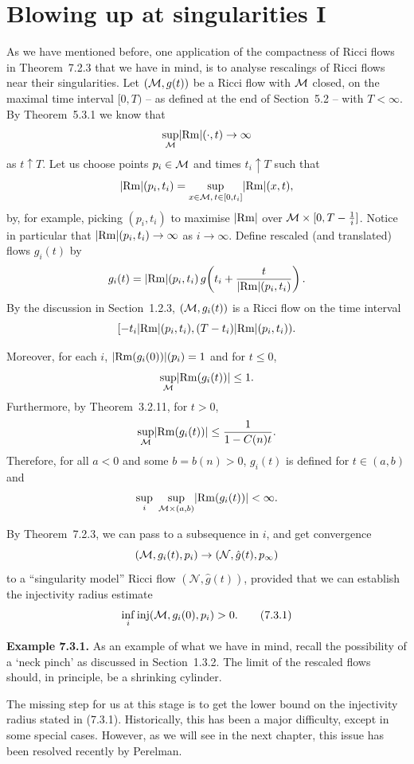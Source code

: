 \section{Blowing up at singularities I}

As we have mentioned before, one application of the compactness of Ricci flows
in Theorem~7.2.3 that we have in mind, is to analyse rescalings of Ricci flows
near their singularities. Let $(\mathcal{M},g(t))$ be a Ricci flow with $\mathcal{M}$ closed, on
the maximal time interval $[0,T)$ -- as defined at the end of
Section~5.2 -- with $T < \infty$. By Theorem~5.3.1 we know that
\[
\sup_{\mathcal{M}} \lvert \operatorname{Rm}\rvert(\cdot,t) \to \infty
\]
as $t \uparrow T$. Let us choose points $p_i \in \mathcal{M}$ and times $t_i \uparrow T$
such that
\[
\lvert \operatorname{Rm}\rvert(p_i,t_i) = \sup_{x \in \mathcal{M},\, t \in [0,t_i]} \lvert \operatorname{Rm}\rvert(x,t),
\]
by, for example, picking $(p_i,t_i)$ to maximise $\lvert \operatorname{Rm}\rvert$ over
$\mathcal{M} \times [0, T - \frac{1}{i}]$. Notice in particular that
$\lvert \operatorname{Rm}\rvert(p_i,t_i) \to \infty$ as $i \to \infty$. Define rescaled (and
translated) flows $g_i(t)$ by
\[
g_i(t) = \lvert \operatorname{Rm}\rvert(p_i,t_i)\, g\!\left(t_i + \frac{t}{\lvert \operatorname{Rm}\rvert(p_i,t_i)}\right).
\]
By the discussion in Section~1.2.3, $(\mathcal{M},g_i(t))$ is a Ricci flow on the time
interval
\[
[-t_i\lvert \operatorname{Rm}\rvert(p_i,t_i), (T-t_i)\lvert \operatorname{Rm}\rvert(p_i,t_i)).
\]

Moreover, for each $i$, $\lvert \operatorname{Rm}(g_i(0))\rvert(p_i) = 1$ and for $t \le 0$,
\[
\sup_{\mathcal{M}} \lvert \operatorname{Rm}(g_i(t))\rvert \le 1.
\]
Furthermore, by Theorem~3.2.11, for $t > 0$,
\[
\sup_{\mathcal{M}} \lvert \operatorname{Rm}(g_i(t))\rvert \le \frac{1}{1 - C(n)t}.
\]
Therefore, for all $a < 0$ and some $b = b(n) > 0$, $g_i(t)$ is defined for
$t \in (a,b)$ and
\[
\sup_i \ \sup_{\mathcal{M} \times (a,b)} \lvert \operatorname{Rm}(g_i(t))\rvert < \infty.
\]

By Theorem~7.2.3, we can pass to a subsequence in $i$, and get convergence
\[
(\mathcal{M}, g_i(t), p_i)\to (\mathcal{N}, \hat g(t), p_\infty)
\]
to a ``singularity model'' Ricci flow $(\mathcal{N},\hat g(t))$, provided that
we can
establish the injectivity radius estimate
\begin{equation}
\inf_i \operatorname{inj}(\mathcal{M}, g_i(0), p_i) > 0.
\tag{7.3.1}
\end{equation}

\noindent\textbf{Example 7.3.1.} As an example of what we have in mind, recall
the possibility of a `neck pinch' as discussed in Section~1.3.2. The limit of
the rescaled flows should, in principle, be a shrinking cylinder.

\noindent
The missing step for us at this stage is to get the lower bound on the
injectivity radius stated in (7.3.1). Historically, this has been a major
difficulty, except in some special cases. However, as we will see in the next
chapter, this issue has been resolved recently by Perelman.
